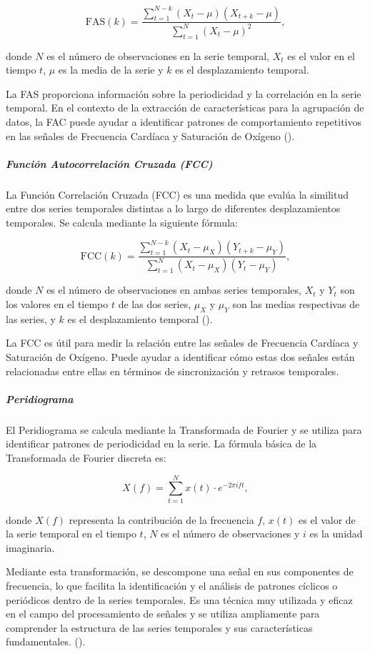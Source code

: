 \[
\text{FAS}(k) = \frac{\sum_{t=1}^{N-k}(X_t - \mu)(X_{t+k} - \mu)}{\sum_{t=1}^{N}(X_t - \mu)^2}
,\]

donde $N$ es el número de observaciones en la serie temporal, $X_t$ es el valor en el tiempo $t$, $\mu$ es la media de la serie y $k$ es el desplazamiento temporal.

La FAS proporciona información sobre la periodicidad y la correlación en la serie temporal. En el contexto de la extracción de características para la agrupación de datos, la FAC puede ayudar a identificar patrones de comportamiento repetitivos en las señales de Frecuencia Cardíaca y Saturación de Oxígeno (\cite{shumway2017chapter1}).

\subparagraph{Función Autocorrelación Cruzada (FCC)}

La Función Correlación Cruzada (FCC) es una medida que evalúa la similitud entre dos series temporales distintas a lo largo de diferentes desplazamientos temporales. Se calcula mediante la siguiente fórmula:

\[
\text{FCC}(k) = \frac{\sum_{t=1}^{N-k}(X_t - \mu_X)(Y_{t+k} - \mu_Y)}{\sum_{t=1}^{N}(X_t - \mu_X)(Y_t - \mu_Y)}
,\]

donde $N$ es el número de observaciones en ambas series temporales, $X_t$ y $Y_t$ son los valores en el tiempo $t$ de las dos series, $\mu_X$ y $\mu_Y$ son las medias respectivas de las series, y $k$ es el desplazamiento temporal (\cite{shumway2017chapter1}).

La FCC es útil para medir la relación entre las señales de Frecuencia Cardíaca y Saturación de Oxígeno. Puede ayudar a identificar cómo estas dos señales están relacionadas entre ellas en términos de sincronización y retrasos temporales.

\subparagraph{Peridiograma}

El Peridiograma se calcula mediante la Transformada de Fourier y se utiliza para identificar patrones de periodicidad en la serie. La fórmula básica de la Transformada de Fourier discreta es:

\[
X(f) = \sum_{t=1}^{N} x(t) \cdot e^{-2\pi i f t}
,\]

donde $X(f)$ representa la contribución de la frecuencia $f$, $x(t)$ es el valor de la serie temporal en el tiempo $t$, $N$ es el número de observaciones y $i$ es la unidad imaginaria. 

Mediante esta transformación, se descompone una señal en sus componentes de frecuencia, lo que facilita la identificación y el análisis de patrones cíclicos o periódicos dentro de la series temporales. Es una técnica muy utilizada y eficaz en el campo del procesamiento de señales y se utiliza ampliamente para comprender la estructura de las series temporales y sus características fundamentales. (\cite{schuster1898investigation}).

